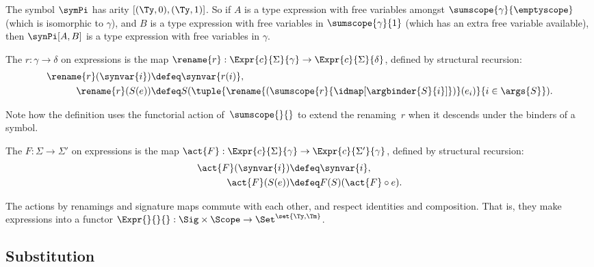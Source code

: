\begin{example}%
  \label{ex:symbol-pi-arity}
  The symbol $\symPi$ has arity $[(\Ty,0),(\Ty,1)]$.
  So if $A$ is a type expression with free variables amongst $\sumscope{\gamma}{\emptyscope}$ (which is isomorphic to $\gamma$), and $B$ is a type expression with free variables in $\sumscope{\gamma}{1}$ (which has an extra free variable available), then $\synPi[A,B]$ is a type expression with free variables in $\gamma$.
\end{example}

\begin{definition}
  \label{renaming-action}%
  The  $r : \gamma \to \delta$ on expressions is the map $\rename{r} : \Expr{c}{\Sigma}{\gamma} \to \Expr{c}{\Sigma}{\delta}$, defined by structural recursion:
  \begin{align*}
    \rename{r} (\synvar{i}) &\defeq \synvar{r(i)}, \\
    \rename{r} (S(e)) &\defeq
      S(\tuple{\rename{(\sumscope{r}{\idmap[\argbinder{S}{i}]})}(e_i)}{i \in \args{S}}).
  \end{align*}
\end{definition}

\noindent
Note how the definition uses the functorial action of~$\sumscope{}{}$ to extend the renaming~$r$ when it descends under the binders of a symbol.

\begin{definition}
  \label{def:signature-map-action}%
  The  $F : \Sigma \to \Sigma'$ on expressions is the map $\act{F} : \Expr{c}{\Sigma}{\gamma} \to \Expr{c}{\Sigma'}{\gamma}$, defined by structural recursion:
  \begin{align*}
    \act{F} (\synvar{i}) & \defeq \synvar{i}, \\
    \act{F} (S(e)) &\defeq F(S)(\act{F} \circ e).
  \end{align*}
\end{definition}

\begin{propositionwithqed}
  \label{prop:commutation-renaming-signature-map}%
  The actions by renamings and signature maps commute with each other, and respect identities and composition.
  That is, they make expressions into a functor 
  $\Expr{}{}{} : \Sig \times \Scope \to \Set^{\set{\Ty, \Tm}}$. \qedhere
\end{propositionwithqed}


\subsection{Substitution}
\label{sec:raw-substitutions}

